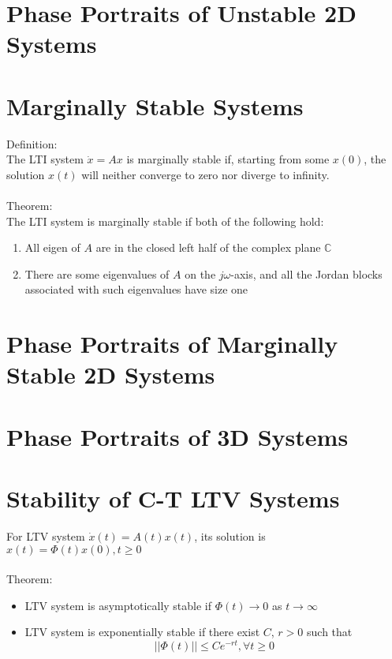 \documentclass[10pt,a4paper,oneside]{article}
\begin{document}
\section{Phase Portraits of Unstable 2D Systems}
\section{Marginally Stable Systems}
Definition:\\
The LTI system $\dot{x}=Ax$ is marginally stable if, starting from some $x(0)$, the solution $x(t)$ will neither converge to zero nor diverge to infinity.\\
\\
Theorem:\\
The LTI system is marginally stable if both of the following hold:
\begin{enumerate}
\item All eigen of $A$ are in the closed left half of the complex plane $\mathbb{C}$
\item There are some eigenvalues of $A$ on the $j\omega$-axis, and all the Jordan blocks associated with such eigenvalues have size one
\end{enumerate}
\section{Phase Portraits of Marginally Stable 2D Systems}
\section{Phase Portraits of 3D Systems}
\section{Stability of C-T LTV Systems}
For LTV system $\dot{x}(t)=A(t)x(t)$, its solution is $x(t) = \Phi(t)x(0),t\geq0$\\
\\
Theorem:
\begin{itemize}
\item LTV system is asymptotically stable if $\Phi(t)\rightarrow0$ as $t\rightarrow\infty$
\item LTV system is exponentially stable if there exist $C$, $r>0$ such that
\[
||\Phi(t)||\leq Ce^{-rt}, \forall t\geq 0
\]
\end{itemize}
\end{document}
